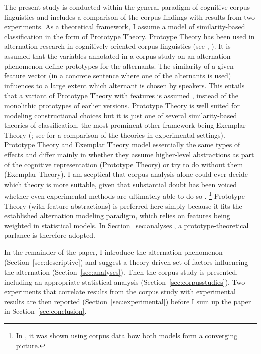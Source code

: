 \documentclass[USenglish]{article}
\begin{document}
The present study is conducted within the general paradigm of cognitive corpus linguistics and includes a comparison of the corpus findings with results from two experiments.
As a theoretical framework, I assume a model of similarity-based classification in the form of Prototype Theory.
Protoype Theory has been used in alternation research in cognitively oriented corpus linguistics (see \citealp{DivjakArppe2013}, \citealp{Gries2003}).
It is assumed that the variables annotated in a corpus study on an alternation phenomenon define prototypes for the alternants.
The similarity of a given feature vector (in a concrete sentence where one of the alternants is used) influences to a large extent which alternant is chosen by speakers.
This entails that a variant of Prototype Theory with features is assumed \citep{Rosch1978}, instead of the monolithic prototypes of earlier versions.
Prototype Theory is well suited for modeling constructional choices but it is just one of several similarity-based theories of classification, the most prominent other framework being Exemplar Theory (\citealp{MedinSchaffer1978,Hintzman1986}; see \citealp{StormsEa2000} for a comparison of the theories in experimental settings).
Prototype Theory and Exemplar Theory model essentially the same types of effects and differ mainly in whether they assume higher-level abstractions as part of the cognitive representation (Prototype Theory) or try to do without them (Exemplar Theory).
I am sceptical that corpus analysis alone could ever decide which theory is more suitable, given that substantial doubt has been voiced whether even experimental methods are ultimately able to do so \citep{Barsalou1990}.%
\footnote{In \cite{DivjakArppe2013}, it was shown using corpus data how both models form a converging picture.}
Prototype Theory (with feature abstractions) is preferred here simply because it fits the established alternation modeling paradigm, which relies on features being weighted in statistical models.
In Section~\ref{sec:analyses}, a prototype-theoretical parlance is therefore adopted.

In the remainder of the paper, I introduce the alternation phenomenon (Section~\ref{sec:descriptive}) and suggest a theory-driven set of factors influencing the alternation (Section~\ref{sec:analyses}).
Then the corpus study is presented, including an appropriate statistical analysis (Section~\ref{sec:corpusstudies}).
Two experiments that correlate results from the corpus study with experimental results are then reported (Section~\ref{sec:experimental}) before I sum up the paper in Section~\ref{sec:conclusion}.
\end{document}
